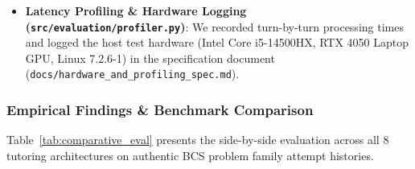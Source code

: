 \documentclass[lettersize,onecolumn,journal]{IEEEtran}
\begin{document}
\begin{itemize}
    \begin{itemize}
        \item \textbf{B0 (Rule/Template)}: Simple pattern matching without learning.
        \item \textbf{B1 (Standard Prompted LLM)}: Direct prompting of an LLM without state verification.
        \item \textbf{B2 (Verify-then-Generate)}: Verifies math validity first, then prompts an LLM.
        \item \textbf{B3 (Bayesian Diagnostic)}: Standard probability updates without admission rules.
        \item \textbf{B4 (IntelliCode Adaptation)}: Knowledge tracing that tracks skill mastery turn-by-turn.
        \item \textbf{B5 (ScaffoldLM Adaptation)}: Uses a step-by-step planning loop to guide student steps.
        \item \textbf{B6 (SLOW Workspace Adaptation)}: Checks counterfactual alternatives before choosing an action.
        \item \textbf{GonitSathi ($G$)}: Our neuro-symbolic system combining symbolic checking with governed evidence admission.
    \end{itemize}
    \item \textbf{Latency Profiling \& Hardware Logging (\texttt{src/evaluation/profiler.py})}: We recorded turn-by-turn processing times and logged the host test hardware (Intel Core i5-14500HX, RTX 4050 Laptop GPU, Linux 7.2.6-1) in the specification document (\texttt{docs/hardware\_and\_profiling\_spec.md}).
\end{itemize}

\subsubsection{Empirical Findings \& Benchmark Comparison}

Table~\ref{tab:comparative_eval} presents the side-by-side evaluation across all 8 tutoring architectures on authentic BCS problem family attempt histories.
\end{document}
